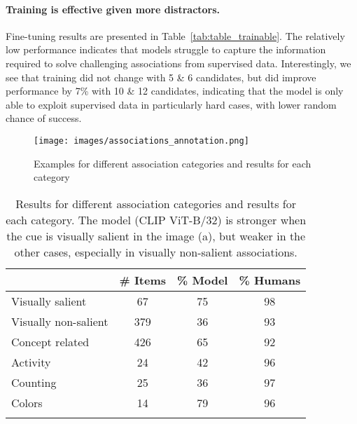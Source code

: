 \documentclass{article}
\begin{document}
\paragraph{Training is effective given more distractors.}
Fine-tuning results are presented in Table~\ref{tab:table_trainable}. The relatively low performance indicates that models struggle to capture the information required to solve challenging associations from supervised data. Interestingly, we see that training did not change with 5 \& 6 candidates, but did improve performance by 7\% with 10 \& 12 candidates, indicating that the model is only able to exploit supervised data in particularly hard cases, with lower random chance of success.

 
\begin{figure}
    \centering
    \texttt{[image: images/associations\_annotation.png]}
    \caption{Examples for different association categories and results for each category}
    \label{fig:strength_and_weaknesses}
\end{figure}

 
\begin{wraptable}{R}{0.58\textwidth}
\centering
\caption{Results for different association categories and results for each category. The model (CLIP ViT-B/32) is stronger when the cue is visually salient in the image (a), but weaker in the other cases, especially in visually non-salient associations.}
\begin{tabular}{@{}lccc@{}}
\toprule
                  & \# Items & \% Model & \% Humans \\ \midrule
Visually salient     & 67      & 75                                                          & 98                                                              \\
Visually non-salient & 379      & 36                                                            & 93                                                              \\ 
Concept related & 426      & 65                                                            & 92                                                              \\ 
Activity & 24      & 42                                                            & 96                                                              \\ 
Counting & 25      & 36                                                            & 97                                                              \\ 
Colors & 14      & 79                                                            & 96                                                              \\ 

\bottomrule
\newline
\end{tabular}
\label{tab:strength_and_weaknesses}
\end{wraptable}
\end{document}

